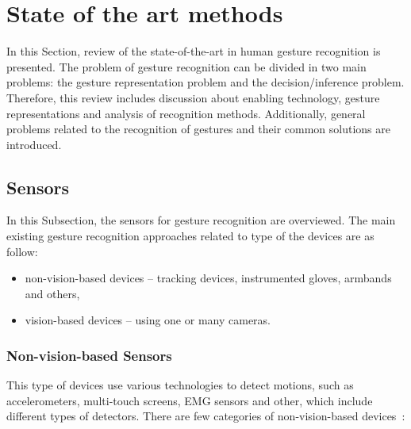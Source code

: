 \section{State of the art methods}
In this Section, review of the state-of-the-art in human gesture recognition is presented. The problem of gesture recognition can be divided in two main problems: the gesture representation problem and the decision/inference problem. Therefore, this review includes discussion about enabling technology, gesture representations and analysis of recognition methods. Additionally, general problems related to the recognition of gestures and their common solutions are introduced.

\subsection{Sensors}
In this Subsection, the sensors for gesture recognition are overviewed. The main existing gesture recognition approaches related to type of the devices are as follow:
\begin{itemize}
\item non-vision-based devices -- tracking devices, instrumented gloves, armbands and others,
\item vision-based devices -- using one or many cameras.
\end{itemize}

\subsubsection*{Non-vision-based Sensors}

This type of devices use various technologies to detect motions, such as accelerometers, multi-touch screens, EMG sensors and other, which include different types of detectors. There are few categories of non-vision-based devices~\cite{kaaniche2009human}:

